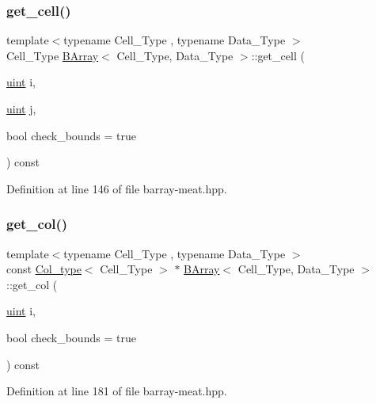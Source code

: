 \subsubsection{\texorpdfstring{get\+\_\+cell()}{get\_cell()}}
{\footnotesize\ttfamily template$<$typename Cell\+\_\+\+Type , typename Data\+\_\+\+Type $>$ \\
Cell\+\_\+\+Type \hyperlink{class_b_array}{B\+Array}$<$ Cell\+\_\+\+Type, Data\+\_\+\+Type $>$\+::get\+\_\+cell (\begin{DoxyParamCaption}\item[{\hyperlink{typedefs_8hpp_a91ad9478d81a7aaf2593e8d9c3d06a14}{uint}}]{i,  }\item[{\hyperlink{typedefs_8hpp_a91ad9478d81a7aaf2593e8d9c3d06a14}{uint}}]{j,  }\item[{bool}]{check\+\_\+bounds = {\ttfamily true} }\end{DoxyParamCaption}) const\hspace{0.3cm}{\ttfamily [inline]}}



Definition at line 146 of file barray-\/meat.\+hpp.

\mbox{\label{class_b_array_a90bd31bc0b3fa59d11150cd4ea39b3b6}} 
\subsubsection{\texorpdfstring{get\+\_\+col()}{get\_col()}}
{\footnotesize\ttfamily template$<$typename Cell\+\_\+\+Type , typename Data\+\_\+\+Type $>$ \\
const \hyperlink{typedefs_8hpp_a00f3fedec1671706175b572e5c57ee0b}{Col\+\_\+type}$<$ Cell\+\_\+\+Type $>$ $\ast$ \hyperlink{class_b_array}{B\+Array}$<$ Cell\+\_\+\+Type, Data\+\_\+\+Type $>$\+::get\+\_\+col (\begin{DoxyParamCaption}\item[{\hyperlink{typedefs_8hpp_a91ad9478d81a7aaf2593e8d9c3d06a14}{uint}}]{i,  }\item[{bool}]{check\+\_\+bounds = {\ttfamily true} }\end{DoxyParamCaption}) const\hspace{0.3cm}{\ttfamily [inline]}}



Definition at line 181 of file barray-\/meat.\+hpp.

\mbox{\label{class_b_array_aee224325422d214624771a5b4d91b55e}} 
